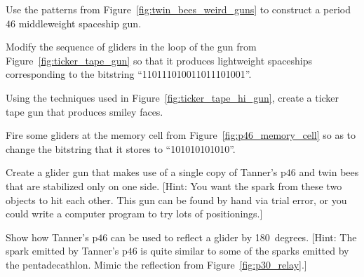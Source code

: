 \begin{multicols}{2}
	
	\mfilbreak
	
	
	\begin{problem}\label{exer:twin_bees_mwss_gun}
		Use the patterns from Figure~\ref{fig:twin_bees_weird_guns} to construct a period~$46$ middleweight spaceship gun.
	\end{problem}
	
	
	\mfilbreak
	
	
	\begin{problem}\label{exer:ticker_tape_gun_store_different}
		Modify the sequence of gliders in the loop of the gun from Figure~\ref{fig:ticker_tape_gun} so that it produces lightweight spaceships corresponding to the bitstring ``110111010011011101001''.
	\end{problem}
	
	
	\mfilbreak
	
	
	\begin{problem}\label{exer:ticker_tape_smiley_gun}
		Using the techniques used in Figure~\ref{fig:ticker_tape_hi_gun}, create a ticker tape gun that produces smiley faces.
	\end{problem}
	
	
	\mfilbreak
	
	
	\begin{problem}\label{exer:ticker_tape_gun_memory_alter}
		Fire some gliders at the memory cell from Figure~\ref{fig:p46_memory_cell} so as to change the bitstring that it stores to ``101010101010''.
	\end{problem}
	
	
	\mfilbreak
	
	
	\begin{problem}\label{exer:tanners_p46_twin_bee_gun}
		Create a glider gun that makes use of a single copy of Tanner's p$46$ and twin bees that are stabilized only on one side. [Hint: You want the spark from these two objects to hit each other. This gun can be found by hand via trial error, or you could write a computer program to try lots of positionings.]
	\end{problem}
	
	
	\mfilbreak
	
	
	\begin{problem}\label{exer:tanners_p46_reflect}
		Show how Tanner's p$46$ can be used to reflect a glider by 180~degrees. [Hint: The spark emitted by Tanner's p$46$ is quite similar to some of the sparks emitted by the pentadecathlon. Mimic the reflection from Figure~\ref{fig:p30_relay}.]
	\end{problem}
	

\end{multicols}
